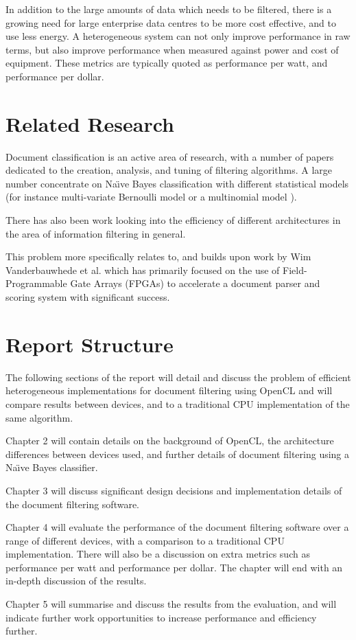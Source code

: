 In addition to the large amounts of data which needs to be filtered, there is a
growing need for large enterprise data centres to be more cost effective, and to
use less energy. A heterogeneous system can not only improve performance in raw
terms, but also improve performance when measured against power and cost of
equipment. These metrics are typically quoted as performance per watt, and
performance per dollar.

\section{Related Research}

Document classification is an active area of research, with a number of papers
dedicated to the creation, analysis, and tuning of filtering algorithms. A large
number concentrate on Na{\"{\i}}ve Bayes classification
\cite{androutsopoulos2000evaluation} \cite{androutsopoulos2000learning}  with
different statistical models (for instance multi-variate Bernoulli model or a
multinomial model \cite{Schneider:2003:CEM:1067807.1067848}
\cite{mccallum1998comparison}).

There has also been work looking into the efficiency of different architectures
in the area of information filtering \cite{chen2012invited}
\cite{he2013massively} in general.

This problem more specifically relates to, and builds upon work by Wim
Vanderbauwhede et al. which has primarily focused on the use of Field-
Programmable Gate Arrays (FPGAs) to accelerate a document parser and scoring
system \cite{vanderbauwhede2013high} \cite{HybridCPUFPGA}
\cite{chalamalasetti2012evaluating} with significant success.

\section{Report Structure}

The following sections of the report will detail and discuss the problem of
efficient heterogeneous implementations for document filtering using OpenCL and
will compare results between devices, and to a traditional CPU implementation of
the same algorithm.

Chapter 2 will contain details on the background of OpenCL, the architecture
differences between devices used, and further details of document filtering
using a Na{\"{\i}}ve Bayes classifier.

Chapter 3 will discuss significant design decisions and implementation details
of the document filtering software.

Chapter 4 will evaluate the performance of the document filtering software over
a range of different devices, with a comparison to a traditional CPU
implementation. There will also be a discussion on extra metrics such as
performance per watt and performance per dollar. The chapter will end with an
in-depth discussion of the results.

Chapter 5 will summarise and discuss the results from the evaluation, and will
indicate further work opportunities to increase performance and efficiency
further.
